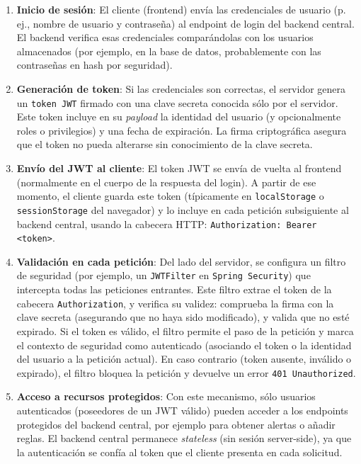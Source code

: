 \documentclass[11pt,a4paper,twoside]{report}
\begin{document}
\begin{enumerate}
	\item \textbf{Inicio de sesión}: El cliente (frontend) envía las credenciales de usuario (p. ej., nombre de usuario y contraseña) al endpoint de login del backend central. El backend verifica esas credenciales comparándolas con los usuarios almacenados (por ejemplo, en la base de datos, probablemente con las contraseñas en hash por seguridad).
	
	\item \textbf{Generación de token}: Si las credenciales son correctas, el servidor genera un \texttt{token JWT} firmado con una clave secreta conocida sólo por el servidor. Este token incluye en su \textit{payload} la identidad del usuario (y opcionalmente roles o privilegios) y una fecha de expiración. La firma criptográfica asegura que el token no pueda alterarse sin conocimiento de la clave secreta.
	
	\item \textbf{Envío del JWT al cliente}: El token JWT se envía de vuelta al frontend (normalmente en el cuerpo de la respuesta del login). A partir de ese momento, el cliente guarda este token (típicamente en \texttt{localStorage} o \texttt{sessionStorage} del navegador) y lo incluye en cada petición subsiguiente al backend central, usando la cabecera HTTP: \texttt{Authorization: Bearer <token>}.
	
	\item \textbf{Validación en cada petición}: Del lado del servidor, se configura un filtro de seguridad (por ejemplo, un \texttt{JWTFilter} en \texttt{Spring Security}) que intercepta todas las peticiones entrantes. Este filtro extrae el token de la cabecera \texttt{Authorization}, y verifica su validez: comprueba la firma con la clave secreta (asegurando que no haya sido modificado), y valida que no esté expirado. Si el token es válido, el filtro permite el paso de la petición y marca el contexto de seguridad como autenticado (asociando el token o la identidad del usuario a la petición actual). En caso contrario (token ausente, inválido o expirado), el filtro bloquea la petición y devuelve un error \texttt{401 Unauthorized}.
	
	\item \textbf{Acceso a recursos protegidos}: Con este mecanismo, sólo usuarios autenticados (poseedores de un JWT válido) pueden acceder a los endpoints protegidos del backend central, por ejemplo para obtener alertas o añadir reglas. El backend central permanece \textit{stateless} (sin sesión server-side), ya que la autenticación se confía al token que el cliente presenta en cada solicitud.
\end{enumerate}
\end{document}
